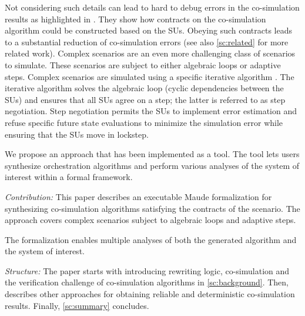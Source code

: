Not considering such details can lead to hard to debug errors in the co-simulation results as highlighted in \cite{Gomes2019,Oakes2021}. 
They show how contracts on the co-simulation algorithm could be constructed based on the SUs. 
Obeying such contracts leads to a substantial reduction of co-simulation errors (see also \cref{sc:related} for more related work). 
Complex scenarios are an even more challenging class of scenarios to simulate.
These scenarios are subject to either algebraic loops or adaptive steps. 
Complex scenarios are simulated using a specific iterative algorithm \cite{thrane2021}. 
The iterative algorithm solves the algebraic loop (cyclic dependencies between the SUs) and ensures that all SUs agree on a step; the latter is referred to as step negotiation. 
Step negotiation permits the SUs to implement error estimation and refuse specific future state evaluations to minimize the simulation error while ensuring that the SUs move in lockstep.

We propose an approach that has been implemented as a tool. The tool lets users synthesize orchestration algorithms and perform various analyses of the system of interest within a formal framework.

\textit{Contribution:}
This paper describes an executable Maude formalization for synthesizing co-simulation algorithms satisfying the contracts of the scenario.
The approach covers complex scenarios subject to algebraic loops and adaptive steps.

The formalization enables multiple analyses of both the generated algorithm and the system of interest. 

\textit{Structure:}
The paper starts with introducing rewriting logic, co-simulation and the verification challenge of co-simulation algorithms in \cref{sc:background}. Then,  describes other approaches for obtaining reliable and deterministic co-simulation results. 
Finally, \cref{sc:summary} concludes.